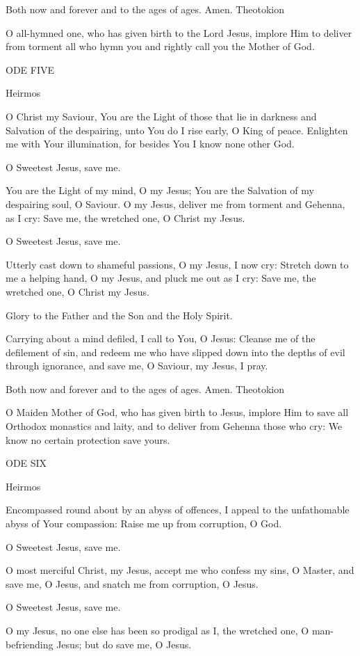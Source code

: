 Both now and forever and to the ages of ages. Amen. Theotokion

O all-hymned one, who has given birth to the Lord Jesus, implore Him to
deliver from torment all who hymn you and rightly call you the Mother of
God.

ODE FIVE

Heirmos

O Christ my Saviour, You are the Light of those that lie in darkness and
Salvation of the despairing, unto You do I rise early, O King of peace.
Enlighten me with Your illumination, for besides You I know none other
God.

O Sweetest Jesus, save me.

You are the Light of my mind, O my Jesus; You are the Salvation of my
despairing soul, O Saviour. O my Jesus, deliver me from torment and
Gehenna, as I cry: Save me, the wretched one, O Christ my Jesus.

O Sweetest Jesus, save me.

Utterly cast down to shameful passions, O my Jesus, I now cry: Stretch
down to me a helping hand, O my Jesus, and pluck me out as I cry: Save
me, the wretched one, O Christ my Jesus.

Glory to the Father and the Son and the Holy Spirit.

Carrying about a mind defiled, I call to You, O Jesus: Cleanse me of the
defilement of sin, and redeem me who have slipped down into the depths
of evil through ignorance, and save me, O Saviour, my Jesus, I pray.

Both now and forever and to the ages of ages. Amen. Theotokion

O Maiden Mother of God, who has given birth to Jesus, implore Him to
save all Orthodox monastics and laity, and to deliver from Gehenna those
who cry: We know no certain protection save yours.

ODE SIX

Heirmos

Encompassed round about by an abyss of offences, I appeal to the
unfathomable abyss of Your compassion: Raise me up from corruption, O
God.

O Sweetest Jesus, save me.

O most merciful Christ, my Jesus, accept me who confess my sins, O
Master, and save me, O Jesus, and snatch me from corruption, O Jesus.

O Sweetest Jesus, save me.

O my Jesus, no one else has been so prodigal as I, the wretched one, O
man-befriending Jesus; but do save me, O Jesus.

